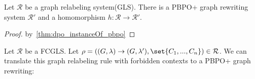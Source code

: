 


\begin{corollary}
    Let $\mathcal{R}$ be a graph relabeling system(GLS). There is a PBPO+ graph rewriting system $\mathcal{R}'$ and a homomorphism $h: \mathcal{R}\to \mathcal{R}'$.
\end{corollary}
\begin{proof}
    by~\autoref{thm:dpo_instanceOf_pbpo}
\end{proof}

Let $\mathcal{R}$ be a FCGLS. Let $\rho = ((G,\lambda) \to (G,\lambda'), \set{C_1,...,C_n}) \in \mathcal{R}$. We can translate this graph relabeling rule with forbidden contexts to a PBPO+ graph rewriting:


